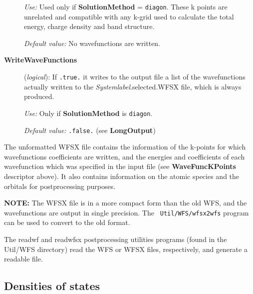 \documentclass[11pt]{article}
\begin{document}
\begin{description}
{\it Use:} Used only if {\bf SolutionMethod} = {\tt diagon}.
These k points are unrelated and compatible with any k-grid used
to calculate the total energy,  charge density and band structure.

{\it Default value:} No wavefunctions are written.

\item[{\bf WriteWaveFunctions}] ({\it logical}):
   If {\tt .true.} it writes to the
  output file a list of the wavefunctions actually written to the
{\it Systemlabel}.selected.WFSX file, which is always produced.

{\it Use:} Only if {\bf SolutionMethod} is {\tt diagon}.

{\it Default value:} {\tt .false.} (see {\bf LongOutput})


\end{description}

The unformatted WFSX file contains the information of the
k-points for which wavefunctions coefficients are written, and the
energies and coefficients of each wavefunction which was specified in
the input file (see {\bf WaveFuncKPoints} descriptor above). It also contains information
on the atomic species and the orbitals for postprocessing purposes.

{\bf NOTE:} The WFSX file is in a more compact form than the old WFS,
and the wavefunctions are output in single precision. The {\tt
  Util/WFS/wfsx2wfs} program can be used to convert to the old format.

\noindent
The readwf and readwfsx postprocessing
utilities programs (found in the Util/WFS directory) read the WFS or WFSX
files, respectively, and generate a readable file.


\vspace{5pt}
\subsection{Densities of states}
\end{document}
